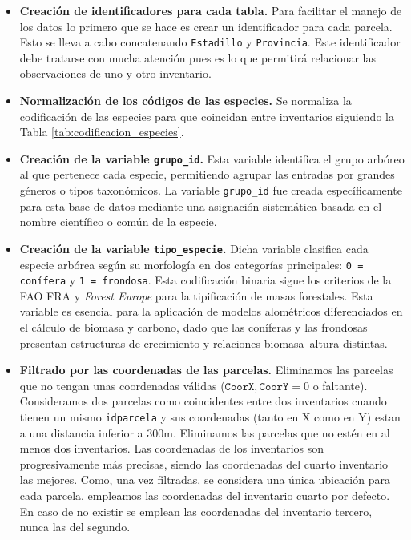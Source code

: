 \begin{itemize}
    \item \textbf{Creación de identificadores para cada tabla.} Para facilitar el manejo de los datos lo primero que se hace es crear un identificador para cada parcela. Esto se lleva a cabo concatenando \texttt{Estadillo} y \texttt{Provincia}. Este identificador debe tratarse con mucha atención pues es lo que permitirá relacionar las observaciones de uno y otro inventario.
    
    \medskip
    
    \item \textbf{Normalización de los códigos de las especies.} Se normaliza la codificación de las especies para que coincidan entre inventarios siguiendo la Tabla \ref{tab:codificacion_especies}. 

    \medskip

    \item \textbf{Creación de la variable \texttt{grupo\_id}.} Esta variable identifica el grupo arbóreo al que pertenece cada especie, permitiendo agrupar las entradas por grandes géneros o tipos taxonómicos. La variable \texttt{grupo\_id} fue creada específicamente para esta base de datos mediante una asignación sistemática basada en el nombre científico o común de la especie. 
    
    \medskip

    \item \textbf{Creación de la variable \texttt{tipo\_especie}.} Dicha variable clasifica cada especie arbórea según su morfología en dos categorías principales: \texttt{0 = conífera} y \texttt{1 = frondosa}. Esta codificación binaria sigue los criterios de la FAO FRA y \textit{Forest Europe} para la tipificación de masas forestales. Esta variable es esencial para la aplicación de modelos alométricos diferenciados en el cálculo de biomasa y carbono, dado que las coníferas y las frondosas presentan estructuras de crecimiento y relaciones biomasa–altura distintas.

    \medskip

    \item \textbf{Filtrado por las coordenadas de las parcelas. } Eliminamos las parcelas que no tengan unas coordenadas válidas ($\texttt{CoorX}, \texttt{CoorY} =0$ o faltante). Consideramos dos parcelas como coincidentes entre dos inventarios cuando  tienen un mismo \texttt{idparcela} y sus coordenadas (tanto en X como en Y) estan a una distancia inferior a $300$m. Eliminamos las parcelas que no estén en al menos dos inventarios. Las coordenadas de los inventarios son progresivamente más precisas, siendo las coordenadas del cuarto inventario las mejores. Como, una vez filtradas, se considera una única ubicación para cada parcela, empleamos las coordenadas del inventario cuarto por defecto. En caso de no existir se emplean las coordenadas del inventario tercero, nunca las del segundo. 


\end{itemize}
